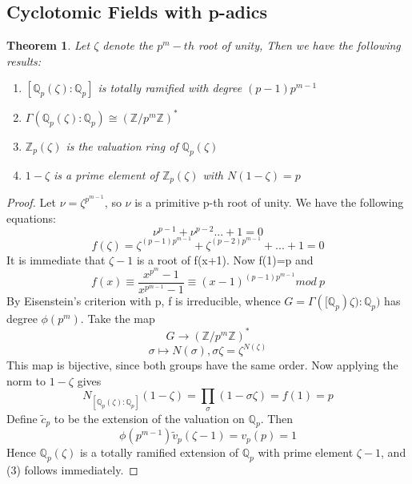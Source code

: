 \documentclass[preprint,12pt,reqno]{elsarticle}
\newtheorem{theorem}{Theorem}
\begin{document}
\subsection{Cyclotomic Fields with p-adics}
\begin{theorem}
    Let $\zeta$ denote the $p^m-th$ root of unity, 
    Then we have the following results:
    \begin{enumerate}
        \item $[\mathbb{Q}_{p}(\zeta):\mathbb{Q}_p]$ is totally ramified with degree $(p-1)p^{m-1}$
        \item $\Gamma(\mathbb{Q}_{p}(\zeta):\mathbb{Q}_p)\cong (\mathbb{Z}/p^{m}\mathbb{Z})^{*}$
        \item $\mathbb{Z}_{p}(\zeta)$ is the valuation ring of $\mathbb{Q}_{p}(\zeta)$
        \item $1-\zeta$ is a prime element of $\mathbb{Z}_{p}(\zeta)$ with $N(1-\zeta)=p$
    \end{enumerate}
\end{theorem}
\begin{proof}
Let $\nu = \zeta^{p^{m-1}}$, so $\nu$ is a primitive p-th root of unity. We have the following equations: 
\begin{equation}
    \nu^{p-1}+\nu^{p-2}...+1=0
\end{equation}
\begin{equation}
   f(\zeta)= \zeta^{(p-1)p^{m-1}}+\zeta^{(p-2)p^{m-1}}+...+1=0
\end{equation}
It is immediate that $\zeta-1$ is a root of f(x+1). Now f(1)=p and \begin{equation}
    f(x)\equiv \frac{x^{p^{m}}-1}{x^{p^{m-1}}-1} \equiv (x-1)^{(p-1)p^{m-1}} mod\:p
\end{equation}
By Eisenstein's criterion with p, f is irreducible, whence $G=\Gamma([\mathbb{Q}_{p})\zeta):\mathbb{Q}_{p})$ has degree $\phi(p^{m})$. Take the map \begin{equation}
    G\longrightarrow (\mathbb{Z}/p^{m}\mathbb{Z})^{*}
\end{equation}
\begin{equation}
    \sigma \longmapsto N(\sigma), \sigma\zeta=\zeta^{N(\zeta)}
\end{equation}
This map is bijective, since both groups have the same order. Now applying the norm to $1-\zeta$ gives \begin{equation}
    N_{[\mathbb{Q}_{p}(\zeta):\mathbb{Q}_{p}]}(1-\zeta) = \prod_{\sigma}(1-\sigma\zeta)=f(1)=p
\end{equation}
Define $\tilde{c}_{p}$ to be the extension of the valuation on $\mathbb{Q}_{p}$. Then \begin{equation}
    \phi(p^{m-1})\tilde{v}_{p}(\zeta-1) = v_{p}(p)=1
\end{equation}
Hence $\mathbb{Q}_{p}(\zeta)$ is a totally ramified extension of $\mathbb{Q}_p$ with prime element $\zeta-1$, and (3) follows immediately. 
\end{proof}
\end{document}
